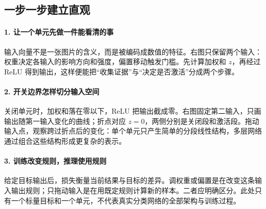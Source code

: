 \subsection*{一步一步建立直观}

\paragraph{1. 让一个单元先做一件能看清的事}

输入向量不是一张图片的含义，而是被编码成数值的特征。右图只保留两个输入：权重决定各输入的影响方向和强度，偏置移动触发门槛。先计算加权和 $z$，再经过 ReLU 得到输出，这样便能把“收集证据”与“决定是否激活”分成两个步骤。



\paragraph{2. 开关边界怎样切分输入空间}

关闭单元时，加权和落在零以下，ReLU 把输出截成零。右图固定第二输入，只画输出随第一输入变化的曲线；折点对应 $z=0$，两侧分别是关闭段和激活段。拖动输入点，观察跨过折点后的变化：单个单元只产生简单的分段线性结构，多层网络通过组合这些结构形成更复杂的表示。



\paragraph{3. 训练改变规则，推理使用规则}

给定目标输出后，损失衡量当前结果与目标的差异。调权重或偏置是在改变这条输入输出规则；只拖动输入是在用既定规则计算新的样本。二者应明确区分。此处只有一个标量目标和一个单元，不代表真实分类网络的全部架构与训练过程。
